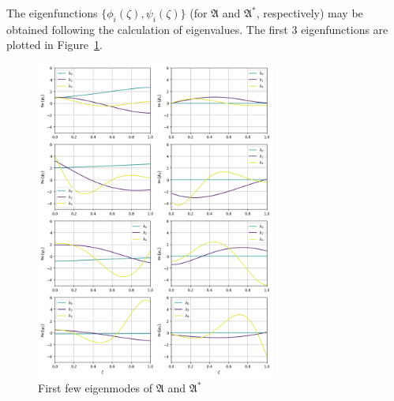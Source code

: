 The eigenfunctions $\{ \phi_i(\zeta), \psi_i(\zeta) \}$ (for $\mathfrak{A}$ and $\mathfrak{A}^*$, respectively) may be obtained following the calculation of eigenvalues. The first 3 eigenfunctions are plotted in Figure~\ref{fig:eigfun}. 

\begin{figure}[ht]
    \centering
    \includegraphics[width=0.7\textwidth]{Figures/eigfuns.png}
    \caption{First few eigenmodes of $\mathfrak{A}$ and $\mathfrak{A}^*$}
    \label{fig:eigfun}
\end{figure}
